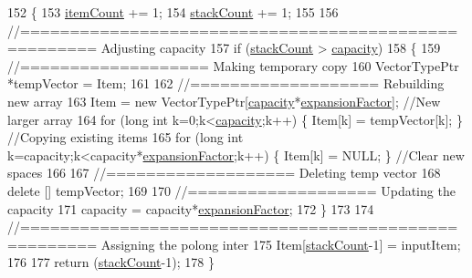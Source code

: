 \begin{DoxyCode}
152 \{
153     \hyperlink{class_c_h_i___v_e_c_t_o_r_a0d37a8a4650059da0888be2d9c38487a}{itemCount} += 1;
154     \hyperlink{class_c_h_i___v_e_c_t_o_r_a91ef30712b0ead293dfe1adc29fee555}{stackCount} += 1;
155 
156     \textcolor{comment}{//===================================================== Adjusting capacity}
157     \textcolor{keywordflow}{if} (\hyperlink{class_c_h_i___v_e_c_t_o_r_a91ef30712b0ead293dfe1adc29fee555}{stackCount} > \hyperlink{class_c_h_i___v_e_c_t_o_r_ae73d9f91b472ae07bc32236605934ddb}{capacity})
158     \{
159         \textcolor{comment}{//=================== Making temporary copy}
160         VectorTypePtr *tempVector = Item;
161 
162         \textcolor{comment}{//=================== Rebuilding new array}
163         Item = \textcolor{keyword}{new} VectorTypePtr[\hyperlink{class_c_h_i___v_e_c_t_o_r_ae73d9f91b472ae07bc32236605934ddb}{capacity}*\hyperlink{class_c_h_i___v_e_c_t_o_r_a587c8d362d5149da97ec6519430c4747}{expansionFactor}];                                      \textcolor{comment}{
      //New larger array}
164         \textcolor{keywordflow}{for} (\textcolor{keywordtype}{long} \textcolor{keywordtype}{int} k=0;k<\hyperlink{class_c_h_i___v_e_c_t_o_r_ae73d9f91b472ae07bc32236605934ddb}{capacity};k++)                           \{ Item[k] = tempVector[k]; \}    \textcolor{comment}{
      //Copying existing items}
165         \textcolor{keywordflow}{for} (\textcolor{keywordtype}{long} \textcolor{keywordtype}{int} k=capacity;k<capacity*\hyperlink{class_c_h_i___v_e_c_t_o_r_a587c8d362d5149da97ec6519430c4747}{expansionFactor};k++)     \{ Item[k] = NULL; \}             \textcolor{comment}{
      //Clear new spaces}
166 
167         \textcolor{comment}{//=================== Deleting temp vector}
168         \textcolor{keyword}{delete} [] tempVector;
169 
170         \textcolor{comment}{//=================== Updating the capacity}
171         capacity = capacity*\hyperlink{class_c_h_i___v_e_c_t_o_r_a587c8d362d5149da97ec6519430c4747}{expansionFactor};
172     \}
173 
174     \textcolor{comment}{//===================================================== Assigning the polong inter}
175     Item[\hyperlink{class_c_h_i___v_e_c_t_o_r_a91ef30712b0ead293dfe1adc29fee555}{stackCount}-1] = inputItem;
176 
177     \textcolor{keywordflow}{return} (\hyperlink{class_c_h_i___v_e_c_t_o_r_a91ef30712b0ead293dfe1adc29fee555}{stackCount}-1);
178 \}
\end{DoxyCode}
\mbox{\label{class_c_h_i___v_e_c_t_o_r_ac2de16159d3b3bcc5bc9944121fccf51_ac2de16159d3b3bcc5bc9944121fccf51}} 

